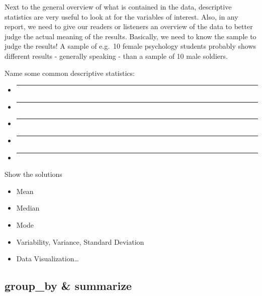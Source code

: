 \documentclass[
]{book}
\providecommand{\tightlist}{%
  \setlength{\itemsep}{0pt}\setlength{\parskip}{0pt}}
\begin{document}
Next to the general overview of what is contained in the data, descriptive statistics are very useful to look at for the variables of interest.
Also, in any report, we need to give our readers or listeners an overview of the data to better judge the actual meaning of the results.
Basically, we need to know the sample to judge the results!
A sample of e.g.~10 female psychology students probably shows different results - generally speaking - than a sample of 10 male soldiers.

Name some common descriptive statistics:

\begin{itemize}
\item
  \begin{center}\rule{0.5\linewidth}{0.5pt}\end{center}
\item
  \begin{center}\rule{0.5\linewidth}{0.5pt}\end{center}
\item
  \begin{center}\rule{0.5\linewidth}{0.5pt}\end{center}
\item
  \begin{center}\rule{0.5\linewidth}{0.5pt}\end{center}
\item
  \begin{center}\rule{0.5\linewidth}{0.5pt}\end{center}
\end{itemize}

Show the solutions

\begin{itemize}
\tightlist
\item
  Mean
\item
  Median
\item
  Mode
\item
  Variability, Variance, Standard Deviation
\item
  Data Visualization\ldots{}
\end{itemize}

\subsection{group\_by \& summarize}\label{group_by-summarize-1}
\end{document}
